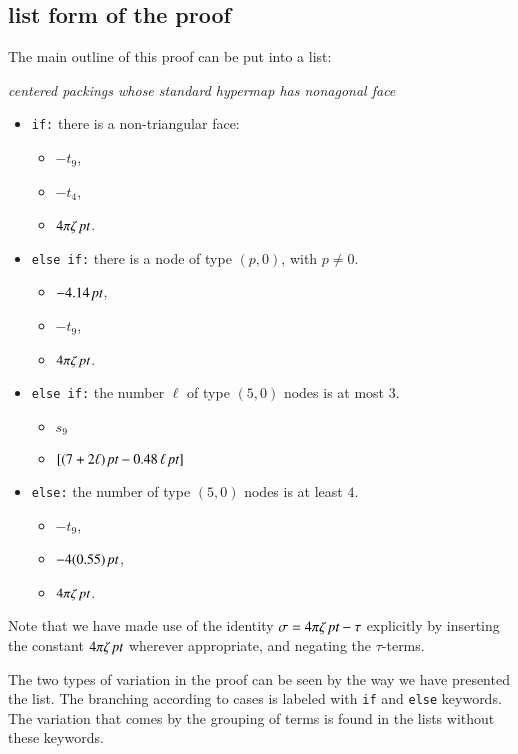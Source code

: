 \subsection{list form of the proof}

The main outline of this proof can be put into a list:
\bigskip
\centerline{\it centered packings whose standard hypermap has nonagonal face\hss}
\begin{itemize}
\item {\tt if:} there is a non-triangular face:
\begin{itemize}
\item $-t_9$,
\item $-t_4$,
\item $4\pi\zeta\,\hbox{\it pt}$.
\end{itemize}
\item {\tt else if:} there is a node of type $(p,0)$, with $p\ne 0$.
\begin{itemize}
\item $-4.14\,\hbox{\it pt}$,
\item $-t_9$,
\item $4\pi\zeta\,\hbox{\it pt}$.
\end{itemize}
\item {\tt else if:} the number $\ell$ of type $(5,0)$ nodes is at most $3$.
\begin{itemize}
\item $s_9$
\item $[(7+2\ell)\,\hbox{\it pt} - 0.48\,\ell\,\hbox{\it pt}]$
\end{itemize}
\item {\tt else:} the number of type $(5,0)$ nodes is at least $4$.
\begin{itemize}
\item $-t_9$,
\item $-4(0.55)\,\hbox{\it pt}$,
\item $4\pi\zeta\,\hbox{\it pt}$.
\end{itemize}
\end{itemize}

Note that we have made use of the identity
$\sigma = 4\pi\zeta\,\hbox{\it pt} - \tau$
explicitly by inserting the constant $4\pi\zeta\,\hbox{\it pt}$ wherever
appropriate, and negating the $\tau$-terms.

The two types of variation in the proof can be seen by the way
we have presented the list.  The branching according to cases
is labeled with {\tt if} and {\tt else} keywords.  The variation
that comes by the grouping of terms is found in the lists without
these keywords.  

